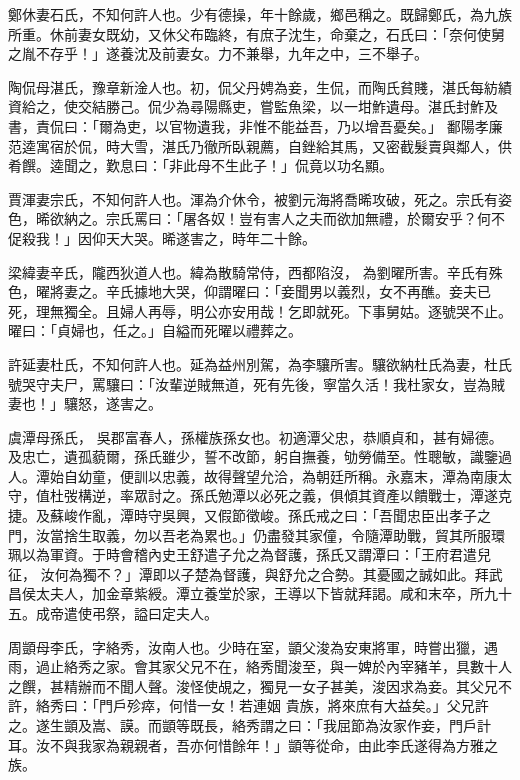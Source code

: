 \begin{pinyinscope}
 鄭休妻石氏，不知何許人也。少有德操，年十餘歲，鄉邑稱之。既歸鄭氏，為九族所重。休前妻女既幼，又休父布臨終，有庶子沈生，命棄之，石氏曰：「奈何使舅之胤不存乎！」遂養沈及前妻女。力不兼舉，九年之中，三不舉子。



 陶侃母湛氏，豫章新淦人也。初，侃父丹娉為妾，生侃，而陶氏貧賤，湛氏每紡績資給之，使交結勝己。侃少為尋陽縣吏，嘗監魚梁，以一坩鮓遺母。湛氏封鮓及書，責侃曰：「爾為吏，以官物遺我，非惟不能益吾，乃以增吾憂矣。」
 鄱陽孝廉范逵寓宿於侃，時大雪，湛氏乃徹所臥親薦，自銼給其馬，又密截髮賣與鄰人，供肴饌。逵聞之，歎息曰：「非此母不生此子！」侃竟以功名顯。



 賈渾妻宗氏，不知何許人也。渾為介休令，被劉元海將喬晞攻破，死之。宗氏有姿色，晞欲納之。宗氏罵曰：「屠各奴！豈有害人之夫而欲加無禮，於爾安乎？何不促殺我！」因仰天大哭。晞遂害之，時年二十餘。



 梁緯妻辛氏，隴西狄道人也。緯為散騎常侍，西都陷沒，
 為劉曜所害。辛氏有殊色，曜將妻之。辛氏據地大哭，仰謂曜曰：「妾聞男以義烈，女不再醮。妾夫已死，理無獨全。且婦人再辱，明公亦安用哉！乞即就死。下事舅姑。逐號哭不止。曜曰：「貞婦也，任之。」自縊而死曜以禮葬之。



 許延妻杜氏，不知何許人也。延為益州別駕，為李驤所害。驤欲納杜氏為妻，杜氏號哭守夫尸，罵驤曰：「汝輩逆賊無道，死有先後，寧當久活！我杜家女，豈為賊妻也！」驤怒，遂害之。



 虞潭母孫氏，
 吳郡富春人，孫權族孫女也。初適潭父忠，恭順貞和，甚有婦德。及忠亡，遺孤藐爾，孫氏雖少，誓不改節，躬自撫養，劬勞備至。性聰敏，識鑒過人。潭始自幼童，便訓以忠義，故得聲望允洽，為朝廷所稱。永嘉末，潭為南康太守，值杜弢構逆，率眾討之。孫氏勉潭以必死之義，俱傾其資產以饋戰士，潭遂克捷。及蘇峻作亂，潭時守吳興，又假節徵峻。孫氏戒之曰：「吾聞忠臣出孝子之門，汝當捨生取義，勿以吾老為累也。」仍盡發其家僮，令隨潭助戰，貿其所服環珮以為軍資。于時會稽內史王舒遣子允之為督護，孫氏又謂潭曰：「王府君遣兒征，
 汝何為獨不？」潭即以子楚為督護，與舒允之合勢。其憂國之誠如此。拜武昌侯太夫人，加金章紫綬。潭立養堂於家，王導以下皆就拜謁。咸和末卒，所九十五。成帝遣使弔祭，謚曰定夫人。



 周顗母李氏，字絡秀，汝南人也。少時在室，顗父浚為安東將軍，時嘗出獵，遇雨，過止絡秀之家。會其家父兄不在，絡秀聞浚至，與一婢於內宰豬羊，具數十人之饌，甚精辦而不聞人聲。浚怪使覘之，獨見一女子甚美，浚因求為妾。其父兄不許，絡秀曰：「門戶殄瘁，何惜一女！若連姻
 貴族，將來庶有大益矣。」父兄許之。遂生顗及嵩、謨。而顗等既長，絡秀謂之曰：「我屈節為汝家作妾，門戶計耳。汝不與我家為親親者，吾亦何惜餘年！」顗等從命，由此李氏遂得為方雅之族。




\end{pinyinscope}
